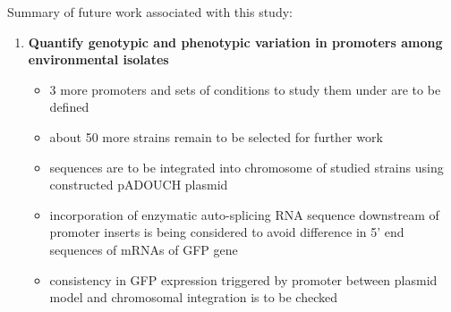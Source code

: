 Summary of future work associated with this study:

\begin{enumerate}

	\item \textbf{Quantify genotypic and phenotypic variation in promoters among environmental  isolates}
	
	\begin{itemize}
	
		\item 3 more promoters and sets of conditions to study them under are to be defined
		\item about 50 more strains remain to be selected for further work
		\item {} sequences are to be integrated into chromosome of studied strains using constructed pADOUCH plasmid
		\item incorporation of enzymatic auto-splicing RNA sequence downstream of promoter inserts is being considered to avoid difference in 5' end sequences of mRNAs of GFP gene
		\item consistency in GFP expression triggered by  promoter between plasmid model and chromosomal integration is to be checked
			
	
	\end{itemize}

\end{enumerate}

\cleardoublepage%

\shorthandon{-}


